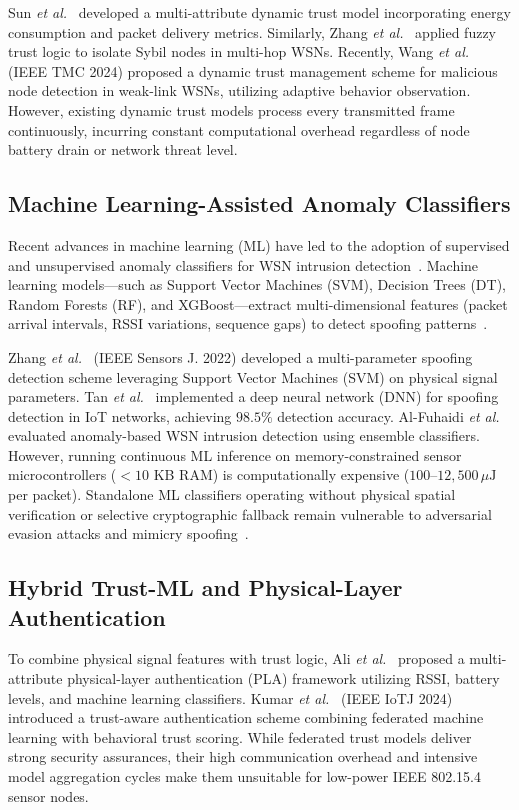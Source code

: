 \documentclass[journal]{IEEEtran}
\begin{document}
Sun \textit{et al.}~\cite{ref_dynamic_trust_27} developed a multi-attribute dynamic trust model incorporating energy consumption and packet delivery metrics. Similarly, Zhang \textit{et al.}~\cite{ref_trust_sybil_28} applied fuzzy trust logic to isolate Sybil nodes in multi-hop WSNs. Recently, Wang \textit{et al.}~\cite{ref_tmc_trust_2024} (IEEE TMC 2024) proposed a dynamic trust management scheme for malicious node detection in weak-link WSNs, utilizing adaptive behavior observation. However, existing dynamic trust models process every transmitted frame continuously, incurring constant computational overhead regardless of node battery drain or network threat level.

\subsection{Machine Learning-Assisted Anomaly Classifiers}
Recent advances in machine learning (ML) have led to the adoption of supervised and unsupervised anomaly classifiers for WSN intrusion detection~\cite{ref_ml_ids_17, ref_ml_wsn_30, ref_wiley_ids_2024}. Machine learning models---such as Support Vector Machines (SVM), Decision Trees (DT), Random Forests (RF), and XGBoost---extract multi-dimensional features (packet arrival intervals, RSSI variations, sequence gaps) to detect spoofing patterns~\cite{ref_rf_wsn_31, ref_xgb_ids_32}.

Zhang \textit{et al.}~\cite{ref_jsen_svm_2022} (IEEE Sensors J. 2022) developed a multi-parameter spoofing detection scheme leveraging Support Vector Machines (SVM) on physical signal parameters. Tan \textit{et al.}~\cite{ref_deep_ids_33} implemented a deep neural network (DNN) for spoofing detection in IoT networks, achieving $98.5\%$ detection accuracy. Al-Fuhaidi \textit{et al.}~\cite{ref_wiley_ids_2024} evaluated anomaly-based WSN intrusion detection using ensemble classifiers. However, running continuous ML inference on memory-constrained sensor microcontrollers ($<10$ KB RAM) is computationally expensive ($100$--$12,500\,\mu\text{J}$ per packet). Standalone ML classifiers operating without physical spatial verification or selective cryptographic fallback remain vulnerable to adversarial evasion attacks and mimicry spoofing~\cite{ref_adv_ml_35}.

\subsection{Hybrid Trust-ML and Physical-Layer Authentication}
To combine physical signal features with trust logic, Ali \textit{et al.}~\cite{ref_pla_mdpi_2024} proposed a multi-attribute physical-layer authentication (PLA) framework utilizing RSSI, battery levels, and machine learning classifiers. Kumar \textit{et al.}~\cite{ref_iotj_fedtrust_2024} (IEEE IoTJ 2024) introduced a trust-aware authentication scheme combining federated machine learning with behavioral trust scoring. While federated trust models deliver strong security assurances, their high communication overhead and intensive model aggregation cycles make them unsuitable for low-power IEEE 802.15.4 sensor nodes.
\end{document}
